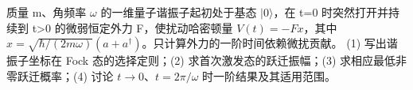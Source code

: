 质量 m、角频率 \(\omega \) 的一维量子谐振子起初处于基态 \(|0\rangle\)，在 t=0 时突然打开并持续到 t>0 的微弱恒定外力 F，使扰动哈密顿量 \(V(t)=-Fx\)，其中 \(x=\sqrt{\hbar/(2m\omega)}(a+a^\dagger)\)。只计算外力的一阶时间依赖微扰贡献。
(1) 写出谐振子坐标在 Fock 态的选择定则；(2) 求首次激发态的跃迁振幅；(3) 求相应最低非零跃迁概率；(4) 讨论 \(t\to0\)、\(t=2\pi/\omega\) 时一阶结果及其适用范围。
